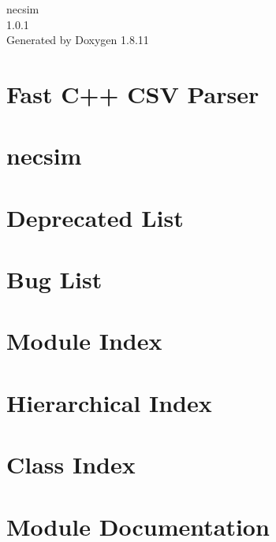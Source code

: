 \documentclass[twoside]{book}
\newcommand{\+}{\discretionary{\mbox{\scriptsize$\hookleftarrow$}}{}{}}
\newcommand{\clearemptydoublepage}{%
  \newpage{\pagestyle{empty}\cleardoublepage}%
}
\begin{document}
\hypersetup{pageanchor=false,
             bookmarksnumbered=true,
             pdfencoding=unicode
            }
\begin{titlepage}
\vspace*{7cm}
\begin{center}%
{\Large necsim \\[1ex]\large 1.\+0.\+1 }\\
\vspace*{1cm}
{\large Generated by Doxygen 1.8.11}\\
\end{center}
\end{titlepage}
\clearemptydoublepage
\tableofcontents
\clearemptydoublepage
{}
\hypersetup{pageanchor=true}

\chapter{Fast C++ C\+SV Parser}
\label{md_necsim_fast-cpp-csv-parser2_README}
\hypertarget{md_necsim_fast-cpp-csv-parser2_README}{}

\chapter{necsim}
\label{md_necsim_README}
\hypertarget{md_necsim_README}{}

\chapter{Deprecated List}
\label{deprecated}
\hypertarget{deprecated}{}

\chapter{Bug List}
\label{bug}
\hypertarget{bug}{}

\chapter{Module Index}

\chapter{Hierarchical Index}

\chapter{Class Index}

\chapter{Module Documentation}

\end{document}

